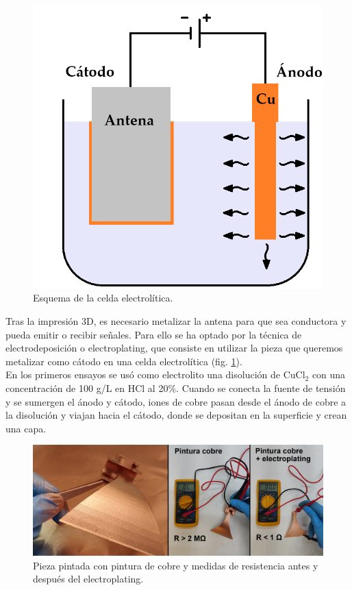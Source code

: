 \documentclass[11pt,a4paper,twoside,pdf]{article}
\numberwithin{equation}{section}
\begin{document}
\begin{figure}
    \vspace{-1.6cm}
    \includegraphics[width=0.9\linewidth]{img/Metalizado/esquemaElectrolisis.png}
    \vspace{-0.2cm}
    \caption{Esquema de la celda electrolítica.}
    \label{fig:esquemaElectrolisis}
\end{figure}
Tras la impresión 3D, es necesario metalizar la antena para que sea conductora y pueda emitir o recibir señales. Para ello se ha optado por la técnica de electrodeposición o electroplating, que consiste en utilizar la pieza que queremos metalizar como cátodo en una celda electrolítica (fig. \ref{fig:esquemaElectrolisis}).\\

En los primeros ensayos se usó como electrolito una disolución de CuCl$_2$ con una concentración de 100 g/L en HCl al 20\%. Cuando se conecta la fuente de tensión y se sumergen el ánodo y cátodo, iones de cobre pasan desde el ánodo de cobre a la disolución y viajan hacia el cátodo, donde se depositan en la superficie y crean una capa.
\begin{figure}[!h]
    \centering
    \includegraphics[width=0.9\linewidth]{img/Metalizado/pinturaCobre.jpg}
    \vspace{-0.2cm}
    \caption{Pieza pintada con pintura de cobre y medidas de resistencia antes y después del electroplating.}
    \label{fig:pinturaCobre}
\end{figure}
\end{document}
